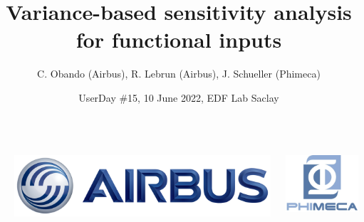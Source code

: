 \documentclass[aspectratio=169]{beamer}
\title[OpenTURNS]{Variance-based sensitivity analysis for functional inputs}
\author[OpenTURNS et al.]{C. Obando (Airbus), R. Lebrun (Airbus), J. Schueller (Phimeca)}
\date[]{UserDay \#15, 10 June 2022, EDF Lab Saclay}
\begin{document}
  \begin{frame}
  \titlepage

  \begin{columns}
  \begin{column}[t]{0.05\textwidth}
        \end{column}
  
  \begin{center}
\includegraphics[height=0.04\textheight]{figures/airbus-logo-3d-blue.png}
\end{center}

  \begin{center}
\includegraphics[height=0.08\textheight]{figures/logo-phimeca.png}
\end{center}


  \end{columns}

  \end{frame}
  

\end{document}
